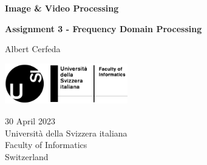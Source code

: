 \documentclass[tikz,14pt,fleqn]{article}
\newcommand\namesurname{Albert Cerfeda}
\newcommand\assignment{Assignment 3 - Frequency Domain Processing}
\newcommand\subject{Image \& Video Processing}
\newcommand\documentdate{30 April 2023}
\begin{document}
\begin{titlepage}
   \begin{center}
       \vspace*{0.2cm}

       \textbf{\Large{\subject}}

       \vspace{0.5cm}
        \textbf{\assignment}\\[5mm]
        
            
       \vspace{0.4cm}

        \namesurname
        \begin{figure}[H]
            \centering
        \end{figure}
       \tableofcontents

       \vspace*{\fill}
     
        \includegraphics[width=0.4\textwidth]{fig/logo.png}
       
        \documentdate \\
        Università della Svizzera italiana\\
        Faculty of Informatics\\
        Switzerland\\

   \end{center}
\end{titlepage}
\end{document}
